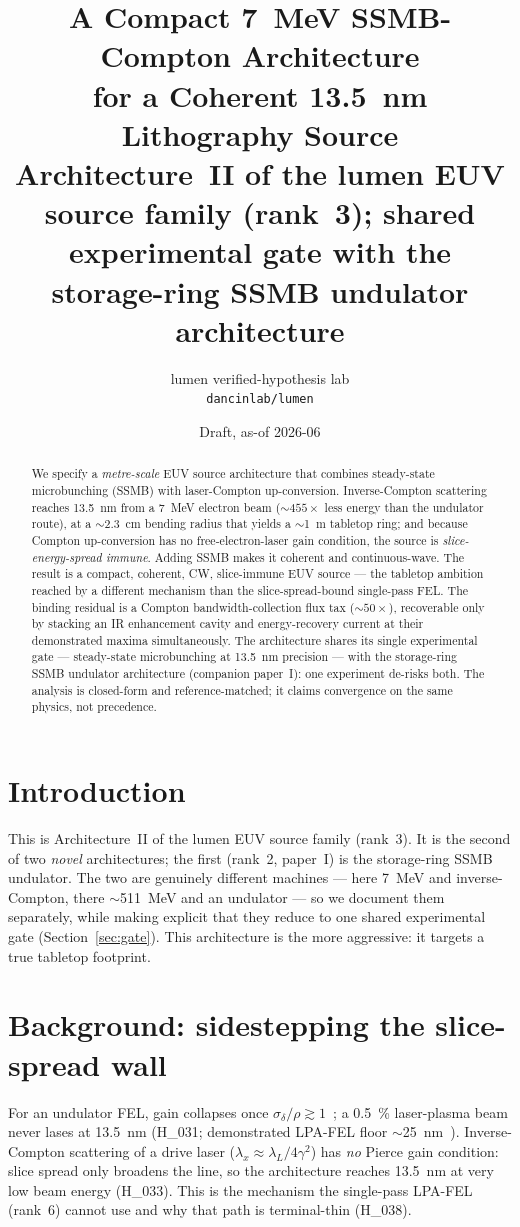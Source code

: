\documentclass[11pt,a4paper]{article}
\title{\textbf{A Compact \SI{7}{\mega\electronvolt} SSMB-Compton Architecture\\
for a Coherent \SI{13.5}{\nano\meter} Lithography Source}\\[4pt]
\large Architecture~II of the lumen EUV source family (rank~3); shared experimental gate with the
storage-ring SSMB undulator architecture}
\author{lumen verified-hypothesis lab \\ \texttt{dancinlab/lumen}}
\date{Draft, as-of 2026-06}
\newcommand{\hyp}[1]{\textcolor{blue!45!black}{\textsf{\small #1}}}
\begin{document}
\maketitle

\begin{abstract}
We specify a \emph{metre-scale} EUV source architecture that combines steady-state microbunching
(SSMB) with laser-Compton up-conversion. Inverse-Compton scattering reaches \SI{13.5}{\nano\meter}
from a \SI{7}{\mega\electronvolt} electron beam ($\sim\!455\times$ less energy than the undulator
route), at a $\sim$\SI{2.3}{\centi\meter} bending radius that yields a $\sim$\SI{1}{\meter} tabletop
ring; and because Compton up-conversion has no free-electron-laser gain condition, the source is
\emph{slice-energy-spread immune}. Adding SSMB makes it coherent and continuous-wave. The result is a
compact, coherent, CW, slice-immune EUV source --- the tabletop ambition reached by a different
mechanism than the slice-spread-bound single-pass FEL. The binding residual is a Compton
bandwidth-collection flux tax ($\sim\!50\times$), recoverable only by stacking an IR enhancement
cavity and energy-recovery current at their demonstrated maxima simultaneously. The architecture
shares its single experimental gate --- steady-state microbunching at \SI{13.5}{\nano\meter}
precision --- with the storage-ring SSMB undulator architecture (companion paper~I): one experiment
de-risks both. The analysis is closed-form and reference-matched; it claims convergence on the same
physics, not precedence.
\end{abstract}

\section{Introduction}
This is Architecture~II of the lumen EUV source family (rank~3). It is the second of two \emph{novel}
architectures; the first (rank~2, paper~I) is the storage-ring SSMB undulator. The two are genuinely
different machines --- here \SI{7}{\mega\electronvolt} and inverse-Compton, there
$\sim$\SI{511}{\mega\electronvolt} and an undulator --- so we document them separately, while making
explicit that they reduce to one shared experimental gate (Section~\ref{sec:gate}). This architecture
is the more aggressive: it targets a true tabletop footprint.

\section{Background: sidestepping the slice-spread wall}
For an undulator FEL, gain collapses once $\sigma_\delta/\rho\gtrsim1$~\citep{mingxie}; a
\SI{0.5}{\percent} laser-plasma beam never lases at \SI{13.5}{\nano\meter} (\hyp{H\_031}; demonstrated
LPA-FEL floor $\sim$\SI{25}{\nano\meter}~\citep{xiao2026}). Inverse-Compton scattering of a drive
laser ($\lambda_x\approx\lambda_L/4\gamma^{2}$) has \emph{no} Pierce gain condition: slice spread only
broadens the line, so the architecture reaches \SI{13.5}{\nano\meter} at very low beam energy
(\hyp{H\_033}). This is the mechanism the single-pass LPA-FEL (rank~6) cannot use and why that path is
terminal-thin (\hyp{H\_038}).
\end{document}

